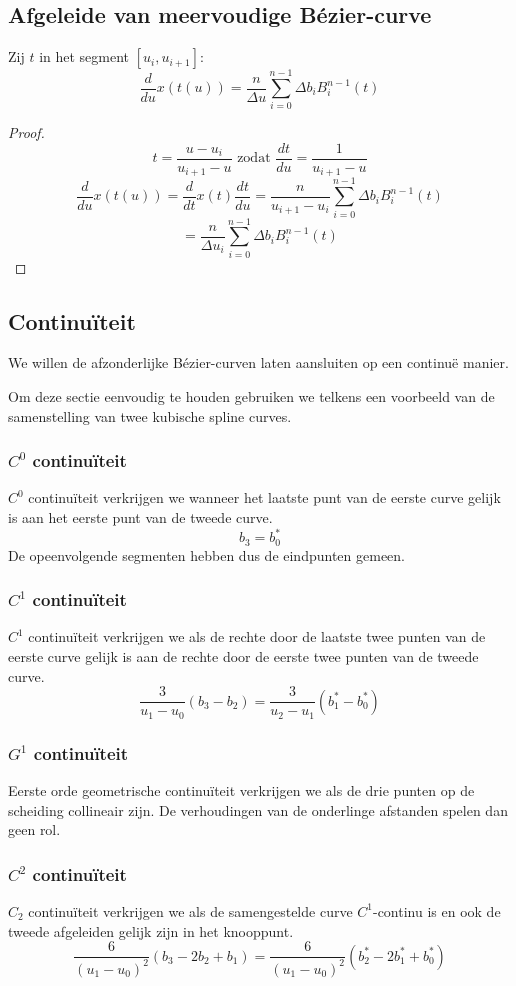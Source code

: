 \documentclass[computergesteund_ontwerp_van_curven_en_oppervlakken.tex]{subfiles}
\begin{document}
\subsection{Afgeleide van meervoudige B\'ezier-curve}
\begin{ei}
Zij $t$ in het segment $[u_i,u_{i+1}]$:
\[
\frac{d}{du}x(t(u))
= \frac{n}{\Delta u}\sum_{i=0}^{n-1}\Delta b_iB_{i}^{n-1}(t)
\]
\begin{proof}
\[
t = \frac{u-u_i}{u_{i+1}-u} \text{ zodat } \frac{dt}{du} = \frac{1}{u_{i+1}-u}
\]
\[
\frac{d}{du}x(t(u))
= \frac{d}{dt} x(t) \frac{dt}{du}
= \frac{n}{u_{i+1}-u_i}\sum_{i=0}^{n-1}\Delta b_iB_{i}^{n-1}(t)
\]
\[
= \frac{n}{\Delta u_i}\sum_{i=0}^{n-1}\Delta b_iB_{i}^{n-1}(t)
\]
\end{proof}
\end{ei}

\subsection{Continu\"iteit}
We willen de afzonderlijke B\'ezier-curven laten aansluiten op een continu\"e manier.

Om deze sectie eenvoudig te houden gebruiken we telkens een voorbeeld van de samenstelling van twee kubische spline curves.

\subsubsection{$C^{0}$ continu\"iteit}
$C^{0}$ continu\"iteit verkrijgen we wanneer het laatste punt van de eerste curve gelijk is aan het eerste punt van de tweede curve.
\[
b_3 = b_0^*
\]
De opeenvolgende segmenten hebben dus de eindpunten gemeen.

\subsubsection{$C^{1}$ continu\"iteit}
$C^{1}$ continu\"iteit verkrijgen we als de rechte door de laatste twee punten van de eerste curve gelijk is aan de rechte door de eerste twee punten van de tweede curve.
\[
\frac{3}{u_1-u_0}(b_3-b_2) = \frac{3}{u_2-u_1}(b_1^{*}-b_0^{*})
\]

\subsubsection{$G^{1}$ continu\"iteit}
Eerste orde geometrische continu\"iteit verkrijgen we als de drie punten op de scheiding collineair zijn. De verhoudingen van de onderlinge afstanden spelen dan geen rol.

\subsubsection{$C^{2}$ continu\"iteit}
$C_{2}$ continu\"iteit verkrijgen we als de samengestelde curve $C^{1}$-continu is en ook de tweede afgeleiden gelijk zijn in het knooppunt.
\[
\frac{6}{(u_1-u_0)^2}(b_3-2b_2+b_1)
= \frac{6}{(u_1-u_0)^2}(b_2^*-2b_1^*+b_0^*)
\]
\end{document}
